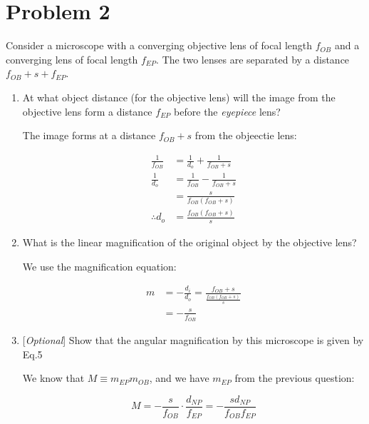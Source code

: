\documentclass{article}
\begin{document}
\pagebreak 
\section*{Problem 2}

Consider a microscope with a converging objective lens of focal length $f_{OB}$ and a converging lens of focal length $f_{EP}$. The two lenses are separated by a distance $f_{OB} + s + f_{EP}$. 

\begin{enumerate}[label=\alph*)]
    \item At what object distance (for the objective lens) will the image from the objective lens form a distance $f_{EP}$ before the \textit{eyepiece} lens?
    
    \begin{solution}
        The image forms at a distance $f_{OB} + s$ from the objeectie lens: 

        \begin{align*}
            \frac{1}{f_{OB}} &= \frac{1}{d_o} + \frac{1}{f_{OB} + s} \\
            \frac{1}{d_o} &= \frac{1}{f_{OB}} - \frac{1}{f_{OB} + s}\\
            &= \frac{s}{f_{OB}(f_{OB} + s)}\\
            \therefore d_o &= \frac{f_{OB}(f_{OB} + s)}{s}
        \end{align*}
    \end{solution}
    \item What is the linear magnification of the original object by the objective lens?
    
    \begin{solution}
        We use the magnification equation:

        \begin{align*}
            m &= -\frac{d_i}{d_o} = \frac{f_{OB} + s}{\frac{f_{OB}(f_{OB} + s)}{s}}\\
            &= -\frac{s}{f_{OB}}
        \end{align*}
    \end{solution}
    \item \phantom{}[\textit{Optional}] Show that the angular magnification by this microscope is given by Eq.5
    \begin{solution}
        We know that $M \equiv m_{EP}m_{OB}$, and we have $m_{EP}$ from the previous question:

        \[ M = -\frac{s}{f_{OB}} \cdot \frac{d_{NP}}{f_{EP}} = -\frac{sd_{NP}}{f_{OB}f_{EP}}\]
    \end{solution}
\end{enumerate}
\end{document}
